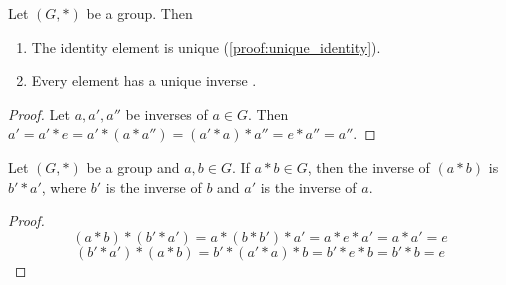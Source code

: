 \begin{theorem}
    Let $(G, *)$ be a group. Then 
    \begin{enumerate}
        \item The identity element is unique (\autoref{proof:unique_identity}).
        \item Every element has a unique inverse .
    \end{enumerate}
    \begin{proof}
        Let $a, a', a''$ be inverses of $a \in G$. Then $a' = a' * e = a' * (a * a'') = (a' * a) * a'' = e * a'' = a''$.
    \end{proof}
\end{theorem}

\begin{corollary}
    Let $(G, *)$ be a group and $a, b \in G$. If $a * b \in G$, then the inverse of $(a * b)$ is $b' * a'$, where $b'$ is the inverse of $b$ and $a'$ is the inverse of $a$.
\end{corollary}
\begin{proof}
    \[
    (a * b) * (b' * a') = a * (b * b') * a' = a * e * a' = a * a' = e
    \]
    \[
    (b' * a') * (a * b) = b' * (a' * a) * b = b' * e * b = b' * b = e
    \]
\end{proof}
